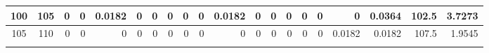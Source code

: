 \begin{table}[ht]
\begin{adjustbox}{width = \textwidth, center}
\begin{tabular}{|cc|r|r|r|r|r|r|r|r|r|r|r|r|r|r|r|rrr|}
        \cellcolor[HTML]{C8E4BE}100          & \cellcolor[HTML]{D9EAD3}105         & 0                                              & 0                                              & \cellcolor[HTML]{C7E9D8}0.0182                 & 0                                              & 0                                              & 0                                              & 0                                              & 0                                               & \cellcolor[HTML]{C7E9D8}0.0182                  & 0                                               & 0                                               & 0                                               & 0                                               & 0                                               & 0                                               & \multicolumn{1}{r|}{\cellcolor[HTML]{D9D2E9}0.0364}                                   & \multicolumn{1}{r|}{\cellcolor[HTML]{D9D2E9}102.5}                      & \cellcolor[HTML]{D9D2E9}3.7273                                                              \\ \hline
        \rowcolor[HTML]{FFFFFF} 
        \cellcolor[HTML]{C8E4BE}105          & \cellcolor[HTML]{D9EAD3}110         & 0                                              & 0                                              & 0                                              & 0                                              & 0                                              & 0                                              & 0                                              & 0                                               & 0                                               & 0                                               & 0                                               & 0                                               & 0                                               & 0                                               & \cellcolor[HTML]{C7E9D8}0.0182                  & \multicolumn{1}{r|}{\cellcolor[HTML]{D9D2E9}0.0182}                                   & \multicolumn{1}{r|}{\cellcolor[HTML]{D9D2E9}107.5}                      & \cellcolor[HTML]{D9D2E9}1.9545                                                              \\ \hline
        \rowcolor[HTML]{FFFFFF} 

\end{tabular}
\end{adjustbox}
\end{table}
